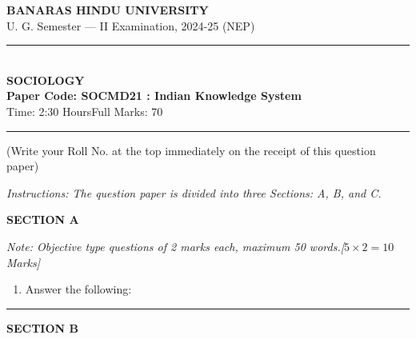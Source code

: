 \documentclass[11pt,a4paper]{article}
\begin{document}
\begin{center}
  {\large\bfseries BANARAS HINDU UNIVERSITY}\\[2pt]
  {\normalsize U. G. Semester --- II Examination, 2024-25 (NEP)}\\[6pt]
  \rule{0.8\linewidth}{0.5pt}\\[6pt]
  {\large\bfseries SOCIOLOGY}\\[4pt]
  {\large\bfseries Paper Code: SOCMD21 : Indian Knowledge System}\\[4pt]
  {\normalsize Time: 2:30 Hours\hfill Full Marks: 70}
\end{center}

\rule{\linewidth}{0.4pt}

\smallskip



\noindent (Write your Roll No. at the top immediately on the receipt of this question paper)

\smallskip



\noindent   \textit{Instructions: The question paper is divided into three Sections: A, B, and C.}

\bigskip

\centerline{   \textbf{SECTION A}}
\smallskip



\noindent   \textit{Note: Objective type questions of 2 marks each, maximum 50 words.\hfill [$5  \times 2 = 10$ Marks]}


\begin{enumerate}[label=   \textbf{1.}]
    \item Answer the following:
    
\end{enumerate}

\bigskip
\rule{\linewidth}{0.2pt}
\medskip

\centerline{   \textbf{SECTION B}}
\smallskip
\end{document}
